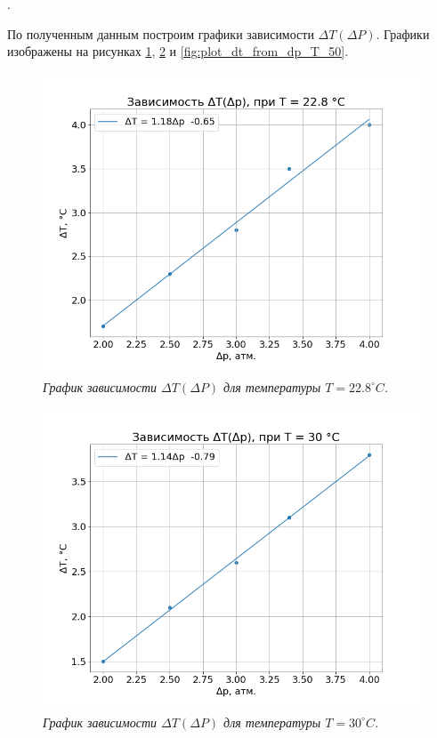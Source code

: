 \documentclass[a4paper, 12pt]{article}
\newcounter{Points}
\newcommand{\point}{\arabic{Points}. \addtocounter{Points}{1}}
\begin{document}
\point По полученным данным построим графики зависимости $\Delta T \left(\Delta P\right)$. Графики изображены на рисунках \ref{fig:plot_dt_from_dp_T_22.8}, \ref{fig:plot_dt_from_dp_T_30} и \ref{fig:plot_dt_from_dp_T_50}.

\begin{figure}[h]
    \centering
    \includegraphics[width=\linewidth]{plot_dt_from_dp_T_22.8.png}
    \caption{\textit{График зависимости $\Delta T \left(\Delta P\right)$ для температуры $T = 22.8 ^\circ C$.}}
    \label{fig:plot_dt_from_dp_T_22.8}
\end{figure}

\begin{figure}[h]
    \centering
    \includegraphics[width=\linewidth]{plot_dt_from_dp_T_30.png}
    \caption{\textit{График зависимости $\Delta T \left(\Delta P\right)$ для температуры $T = 30 ^\circ C$.}}
    \label{fig:plot_dt_from_dp_T_30}
\end{figure}
\end{document}
